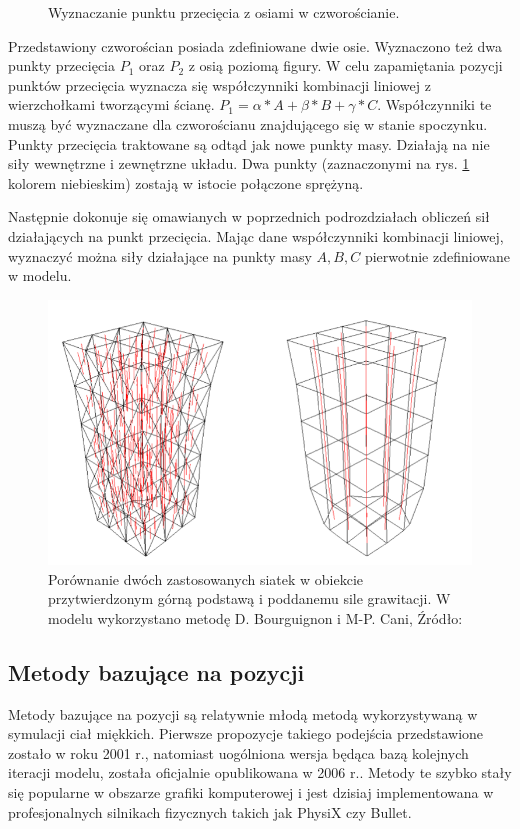 \begin{figure}[ht]
\centering

\caption{Wyznaczanie punktu przecięcia z osiami w czworościanie.}
\label{anizotropia-czworoscian}
\end{figure}

Przedstawiony czworościan posiada zdefiniowane dwie osie. Wyznaczono też dwa punkty przecięcia $P_1$ oraz $P_2$ z osią poziomą figury. W celu zapamiętania pozycji punktów przecięcia wyznacza się współczynniki kombinacji liniowej z wierzchołkami tworzącymi ścianę. $P_1 = \alpha * A + \beta *B + \gamma *C$. Współczynniki te muszą być wyznaczane dla czworościanu znajdującego się w stanie spoczynku. Punkty przecięcia traktowane są odtąd jak nowe punkty masy. Działają na nie siły wewnętrzne i zewnętrzne układu. Dwa punkty (zaznaczonymi na rys. \ref{anizotropia-czworoscian} kolorem niebieskim) zostają w istocie połączone sprężyną.

Następnie dokonuje się omawianych w poprzednich podrozdziałach obliczeń sił działających na punkt przecięcia. Mając dane współczynniki kombinacji liniowej, wyznaczyć można siły działające na punkty masy $A,B,C$ pierwotnie zdefiniowane w modelu. 

\begin{figure}[ht]
\centering
\includegraphics[scale=0.5]{images/fixed_anisotropy.png}
\caption{Porównanie dwóch zastosowanych siatek w obiekcie przytwierdzonym górną podstawą i poddanemu sile grawitacji. W modelu wykorzystano metodę D. Bourguignon i M-P. Cani, Źródło: \cite{ca}}
\label{anizotropia-czworoscian-fix}
\end{figure}

\subsection{Metody bazujące na pozycji}
Metody bazujące na pozycji są relatywnie młodą metodą wykorzystywaną w symulacji
ciał miękkich. Pierwsze propozycje takiego podejścia przedstawione zostało w
roku 2001 r.\cite{jak}, natomiast uogólniona wersja będąca bazą kolejnych
iteracji modelu, została oficjalnie opublikowana w 2006 r.\cite{pbdyn}. Metody te
szybko stały się popularne w obszarze grafiki komputerowej i jest dzisiaj
implementowana w profesjonalnych silnikach fizycznych takich jak PhysiX czy
Bullet.

